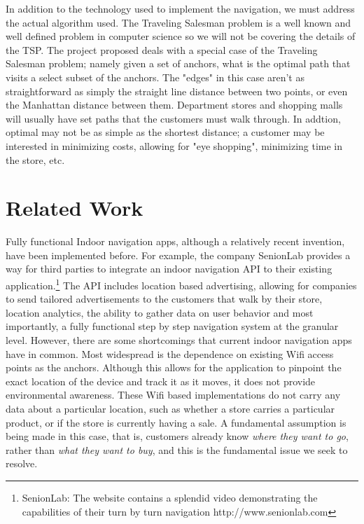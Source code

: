 \documentclass{sig-alternate}
\begin{document}
In addition to the technology used to implement the navigation, we
must address the actual algorithm used. The Traveling Salesman 
problem is a well known and well defined problem in computer science
so we will not be covering the details of the TSP. The project 
proposed deals with a special case of the Traveling Salesman problem; 
namely given a set of anchors, what is the optimal path that visits a 
select subset of the anchors. The "edges" in this case aren't as
straightforward as simply the straight line distance between two points,
or even the Manhattan distance between them. Department stores and
shopping malls will usually have set paths that the customers must walk
through. In addtion, optimal may not be as simple as the shortest 
distance; a customer may be interested in minimizing costs, allowing
for "eye shopping", minimizing time in the store, etc. 

\section{Related Work}
\label{sec:related_work}
Fully functional Indoor navigation apps, although a relatively recent 
invention, have been implemented before. For example, the company
SenionLab provides a way for third parties to integrate an indoor
navigation API to their existing application.\footnote{SenionLab:
The website contains a splendid video demonstrating the capabilities 
of their turn by turn navigation http://www.senionlab.com } The 
API includes location based advertising, allowing for companies to 
send tailored advertisements to the customers that walk by their store, 
location analytics, the ability to gather data on user behavior and most
importantly, a fully functional step by step navigation system at the
granular level. However, there are some shortcomings that current
indoor navigation apps have in common. Most widespread is the 
dependence on existing Wifi access points as the anchors. Although 
this allows for the application to pinpoint the exact location of the 
device and track it as it moves, it does not provide environmental
awareness. These Wifi based implementations do not carry any 
data about a particular location, such as whether a store carries a 
particular product, or if the store is currently having a sale. A 
fundamental assumption is being made in this case, that is, 
customers already know \textit{where they want to go}, rather than 
\textit{what they want to buy}, and this is the fundamental issue
we seek to resolve.
\end{document}
